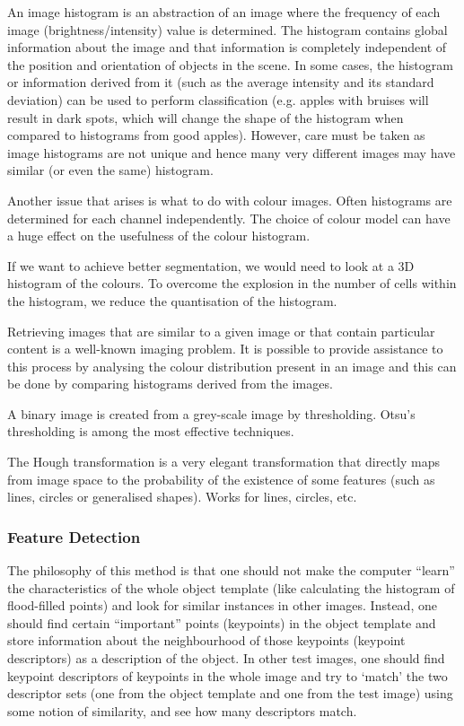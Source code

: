 An image histogram is an abstraction of an image where the frequency of each image (brightness/intensity) value is determined.
The histogram contains global information about the image and that information is completely independent of the position and orientation of objects in the scene. In some cases, the histogram or information derived from it (such as the average intensity and its standard deviation) can be used to perform classification (e.g. apples with bruises will result in dark spots, which will change the shape of the histogram when compared to histograms from good apples). However, care must be taken as image histograms are not unique and hence many very different images may have similar (or even the same) histogram.

Another issue that arises is what to do with colour images. Often histograms are determined for each channel independently. 
The choice of colour model can have a huge effect on the usefulness of the colour histogram.

If we want to achieve better segmentation, we would need to look at a 3D histogram of the colours.
To overcome the explosion in the number of cells within the histogram, we reduce the quantisation of the histogram. 

Retrieving images that are similar to a given image or that contain particular content is a well-known imaging problem.
It is possible to provide assistance to this process by analysing the colour distribution present in an image and this can be done by comparing histograms derived from the images.

A binary image is created from a grey-scale image by thresholding. 
Otsu's thresholding is among the most effective techniques.

The Hough transformation is a very elegant transformation that directly maps from image space to the probability of the existence of some features (such as lines, circles or generalised shapes). Works for lines, circles, etc.

\subsubsection{Feature Detection}

The philosophy of this method is that one should not make the computer ``learn'' the characteristics of the whole object template (like calculating the histogram of flood-filled points) and look for similar instances in other images. Instead, one should find certain ``important'' points (keypoints) in the object template and store information about the neighbourhood of those keypoints (keypoint descriptors) as a description of the object. In other test images, one should find keypoint descriptors of keypoints in the whole image and try to `match' the two descriptor sets (one from the object template and one from the test image) using some notion of similarity, and see how many descriptors match.

